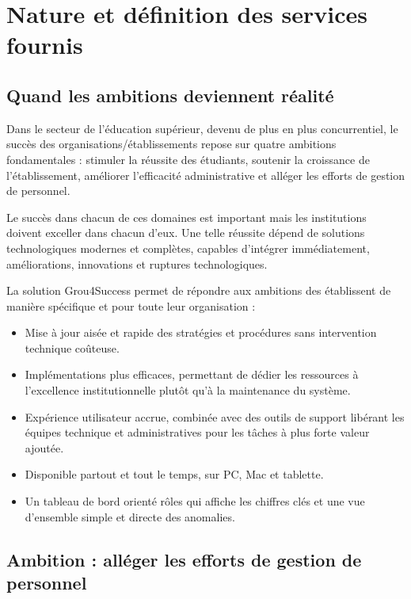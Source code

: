 \chapter{Nature et définition des services fournis}
\minitoc
\newpage
\section{Quand les ambitions deviennent réalité}
Dans le secteur de l'éducation supérieur, devenu de plus en plus concurrentiel,
le succès des organisations/établissements repose sur quatre ambitions
fondamentales : stimuler la réussite des étudiants, soutenir la croissance de l'établissement, améliorer l'efficacité administrative et alléger les efforts de gestion de personnel.
\medskip

Le succès dans chacun de ces domaines est important mais les institutions doivent exceller dans chacun d'eux. Une telle réussite dépend de solutions technologiques modernes et complètes, capables d'intégrer immédiatement, améliorations, innovations et ruptures technologiques.
\medskip

La solution Grou4Success permet de répondre aux ambitions des établissent de manière spécifique et pour toute leur organisation :

\begin{itemize}
	\item Mise à jour aisée et rapide des stratégies et procédures sans intervention technique coûteuse.
	\item Implémentations plus efficaces, permettant de dédier les ressources à l'excellence institutionnelle plutôt qu'à la maintenance du système.
	\item Expérience utilisateur accrue, combinée avec des outils de support libérant les équipes technique et administratives pour les tâches à plus forte valeur ajoutée.
	\item Disponible partout et tout le temps, sur PC, Mac et tablette.
	\item Un tableau de bord orienté rôles qui affiche les chiffres clés et une vue d'ensemble simple et directe des anomalies.
\end{itemize}

\section{Ambition : alléger les efforts de gestion de personnel}

